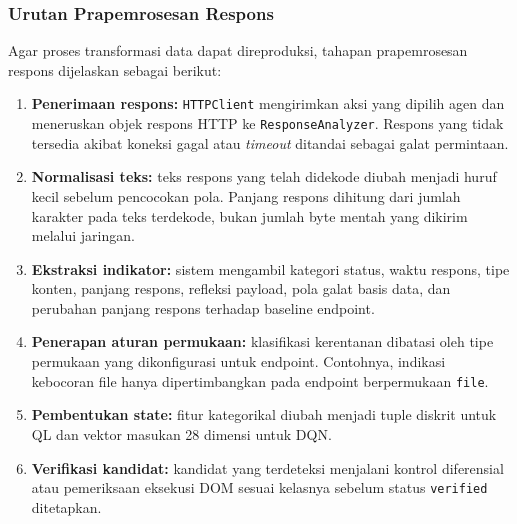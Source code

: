 \begin{enumerate}
    \subsubsection{Urutan Prapemrosesan Respons}

Agar proses transformasi data dapat direproduksi, tahapan prapemrosesan respons dijelaskan sebagai berikut:
\begin{enumerate}
    \item \textbf{Penerimaan respons:} \texttt{HTTPClient} mengirimkan aksi yang dipilih agen dan meneruskan objek respons HTTP ke \texttt{ResponseAnalyzer}. Respons yang tidak tersedia akibat koneksi gagal atau \textit{timeout} ditandai sebagai galat permintaan.
    \item \textbf{Normalisasi teks:} teks respons yang telah didekode diubah menjadi huruf kecil sebelum pencocokan pola. Panjang respons dihitung dari jumlah karakter pada teks terdekode, bukan jumlah byte mentah yang dikirim melalui jaringan.
    \item \textbf{Ekstraksi indikator:} sistem mengambil kategori status, waktu respons, tipe konten, panjang respons, refleksi payload, pola galat basis data, dan perubahan panjang respons terhadap baseline endpoint.
    \item \textbf{Penerapan aturan permukaan:} klasifikasi kerentanan dibatasi oleh tipe permukaan yang dikonfigurasi untuk endpoint. Contohnya, indikasi kebocoran file hanya dipertimbangkan pada endpoint berpermukaan \texttt{file}.
    \item \textbf{Pembentukan state:} fitur kategorikal diubah menjadi tuple diskrit untuk QL dan vektor masukan 28 dimensi untuk DQN.
    \item \textbf{Verifikasi kandidat:} kandidat yang terdeteksi menjalani kontrol diferensial atau pemeriksaan eksekusi DOM sesuai kelasnya sebelum status \texttt{verified} ditetapkan.
\end{enumerate}


\end{enumerate}
